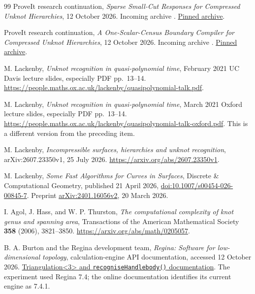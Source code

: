 \begin{thebibliography}{99}
ProveIt research continuation,
\emph{Sparse Small-Cut Responses for Compressed Unknot Hierarchies},
12 October 2026.  Incoming archive
.
\href{https://github.com/VladimirReshetnikov/ProveIt/blob/704600626606a9097cfd89d4e3d2bbc63c8dd1cb/docs/incoming/ProveIt_Unknot_Sparse_Cut_Grammars_2026-10-12.zip}{Pinned archive}.

ProveIt research continuation,
\emph{A One-Scalar-Census Boundary Compiler for Compressed Unknot
Hierarchies}, 12 October 2026.  Incoming archive
.
\href{https://github.com/VladimirReshetnikov/ProveIt/blob/704600626606a9097cfd89d4e3d2bbc63c8dd1cb/docs/incoming/ProveIt_Moment_Coded_First_Returns_2026-10-12.zip}{Pinned archive}.

M. Lackenby,
\emph{Unknot recognition in quasi-polynomial time},
February 2021 UC Davis lecture slides, especially PDF pp.\ 13--14.
\url{https://people.maths.ox.ac.uk/lackenby/quasipolynomial-talk.pdf}.

M. Lackenby,
\emph{Unknot recognition in quasi-polynomial time},
March 2021 Oxford lecture slides, especially PDF pp.\ 13--14.
\url{https://people.maths.ox.ac.uk/lackenby/quasipolynomial-talk-oxford.pdf}.
This is a different version from the preceding item.

M. Lackenby,
\emph{Incompressible surfaces, hierarchies and unknot recognition},
arXiv:2607.23350v1, 25 July 2026.
\url{https://arxiv.org/abs/2607.23350v1}.

M. Lackenby,
\emph{Some Fast Algorithms for Curves in Surfaces},
Discrete \& Computational Geometry, published 21 April 2026,
\href{https://doi.org/10.1007/s00454-026-00845-7}{doi:10.1007/s00454-026-00845-7}.
Preprint \href{https://arxiv.org/abs/2401.16056v2}{arXiv:2401.16056v2},
20 March 2026.

I. Agol, J. Hass, and W. P. Thurston,
\emph{The computational complexity of knot genus and spanning area},
Transactions of the American Mathematical Society \textbf{358} (2006),
3821--3850.
\url{https://arxiv.org/abs/math/0205057}.

B. A. Burton and the Regina development team,
\emph{Regina: Software for low-dimensional topology},
calculation-engine API documentation, accessed 12 October 2026.
\href{https://regina-normal.github.io/engine-docs/classregina_1_1Triangulation_3_013_01_4.html}{Triangulation\textless3\textgreater{} and
\texttt{recogniseHandlebody()} documentation}.
The experiment used Regina 7.4; the online documentation identifies its
current engine as 7.4.1.

\end{thebibliography}
